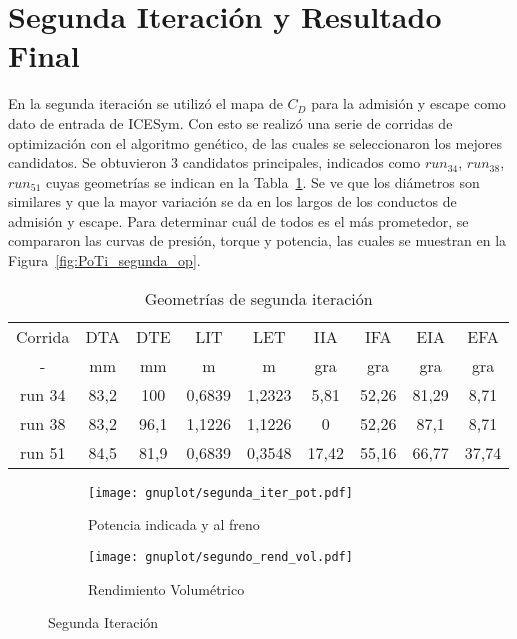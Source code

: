 \section{Segunda Iteración y Resultado Final}
%
En la segunda iteración se utilizó el mapa de $C_D$ para la admisión y escape
como dato de entrada de ICESym.
%
Con esto se realizó una serie de corridas de
optimización con el algoritmo genético, de las cuales se seleccionaron los
mejores candidatos.
%
Se obtuvieron 3 candidatos principales, indicados como \emph{$run_{34}$},
\emph{$run_{38}$}, \emph{$run_{51}$} cuyas geometrías se indican en la
Tabla~\ref{tab:2iter_geom}.
%
Se ve que los diámetros son similares y que la mayor variación se da en los
largos de los conductos de admisión y escape.
%
%
Para determinar cuál de todos es el más prometedor, se compararon las curvas de
presión, torque y potencia, las cuales se muestran en la
Figura~\ref{fig:PoTi_segunda_op}.

\begin{table}
\centering
\begin{tabular}{ccccccccc} \toprule
  Corrida & DTA  & DTE  & LIT    & LET    & IIA   & IFA   & EIA   & EFA \\
  -       & mm   & mm   & m      & m      & gra   & gra   & gra   & gra \\ \midrule
  run 34  & 83,2 & 100  & 0,6839 & 1,2323 & 5,81  & 52,26 & 81,29 & 8,71 \\
  run 38  & 83,2 & 96,1 & 1,1226 & 1,1226 & 0     & 52,26 & 87,1  & 8,71 \\
  run 51  & 84,5 & 81,9 & 0,6839 & 0,3548 & 17,42 & 55,16 & 66,77 & 37,74 \\\bottomrule
\end{tabular}
\caption{Geometrías de segunda iteración}\label{tab:2iter_geom}
\end{table}

\begin{figure}[ht]
  \centering
  \begin{subfigure}[b]{.5\textwidth}
    \centering
    \texttt{[image: gnuplot/segunda\_iter\_pot.pdf]}
    \caption{Potencia indicada y al freno} \label{fig:primer_op}
  \end{subfigure}%
  \begin{subfigure}[b]{.5\textwidth}
    \centering
    \texttt{[image: gnuplot/segundo\_rend\_vol.pdf]}
    \caption{Rendimiento Volumétrico}
  \end{subfigure}
    \caption{Segunda Iteración} \label{fig:primer_op}
\end{figure}


